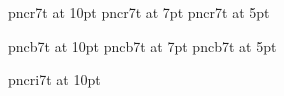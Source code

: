
\font\tenrm pncr7t at 10pt
\font\sevenrm pncr7t at 7pt
\font\fiverm pncr7t at 5pt




\font\tenbf pncb7t at 10pt
\font\sevenbf pncb7t at 7pt
\font\fivebf pncb7t at 5pt



\font\tenit pncri7t at 10pt


\tenrm
{}\sevenrm
{}\fiverm




\textfont\itfam\tenit


\textfont\bffam\tenbf
\scriptfont\bffam\sevenbf
\scriptscriptfont\bffam\fivebf


\rm
